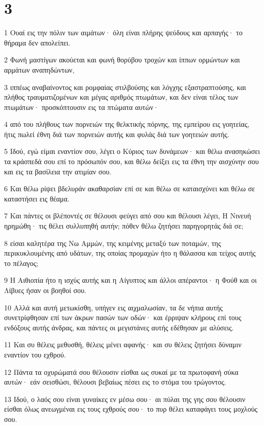 \chapter{3}

\par 1 Ουαί εις την πόλιν των αιμάτων· όλη είναι πλήρης ψεύδους και αρπαγής· το θήραμα δεν απολείπει.
\par 2 Φωνή μαστίγων ακούεται και φωνή θορύβου τροχών και ίππων ορμώντων και αρμάτων αναπηδώντων,
\par 3 ιππέως αναβαίνοντος και ρομφαίας στιλβούσης και λόγχης εξαστραπτούσης, και πλήθος τραυματιζομένων και μέγας αριθμός πτωμάτων, και δεν είναι τέλος των πτωμάτων· προσκόπτουσιν εις τα πτώματα αυτών·
\par 4 από του πλήθους των πορνειών της θελκτικής πόρνης, της εμπείρου εις γοητείας, ήτις πωλεί έθνη διά των πορνειών αυτής και φυλάς διά των γοητειών αυτής.
\par 5 Ιδού, εγώ είμαι εναντίον σου, λέγει ο Κύριος των δυνάμεων· και θέλω ανασηκώσει τα κράσπεδά σου επί το πρόσωπόν σου, και θέλω δείξει εις τα έθνη την αισχύνην σου και εις τα βασίλεια την ατιμίαν σου.
\par 6 Και θέλω ρίψει βδελυράν ακαθαρσίαν επί σε και θέλω σε καταισχύνει και θέλω σε καταστήσει εις θέαμα.
\par 7 Και πάντες οι βλέποντές σε θέλουσι φεύγει από σου και θέλουσι λέγει, Η Νινευή ηρημώθη· τις θέλει συλλυπηθή αυτήν; πόθεν θέλω ζητήσει παρηγορητάς διά σε;
\par 8 είσαι καλητέρα της Νω Αμμών, της κειμένης μεταξύ των ποταμών, της περικυκλουμένης από υδάτων, της οποίας προμαχών ήτο η θάλασσα και τείχος αυτής το πέλαγος;
\par 9 Η Αιθιοπία ήτο η ισχύς αυτής και η Αίγυπτος και άλλοι απέραντοι· η Φούθ και οι Λίβυες ήσαν οι βοηθοί σου.
\par 10 Αλλά και αυτή μετωκίσθη, υπήγεν εις αιχμαλωσίαν, τα δε νήπια αυτής συνετρίφθησαν επί των άκρων πασών των οδών· και έρριψαν κλήρους επί τους ενδόξους αυτής άνδρας, και πάντες οι μεγιστάνες αυτής εδέθησαν με αλύσεις.
\par 11 Και συ θέλεις μεθυσθή, θέλεις μένει αφανής· και συ θέλεις ζητήσει δύναμιν εναντίον του εχθρού.
\par 12 Πάντα τα οχυρώματά σου θέλουσιν είσθαι ως συκαί με τα πρωτοφανή σύκα αυτών· εάν σεισθώσι, θέλουσι βεβαίως πέσει εις το στόμα του τρώγοντος.
\par 13 Ιδού, ο λαός σου είναι γυναίκες εν μέσω σου· αι πύλαι της γης σου θέλουσιν είσθαι όλως ανεωγμέναι εις τους εχθρούς σου· το πυρ θέλει καταφάγει τους μοχλούς σου.
